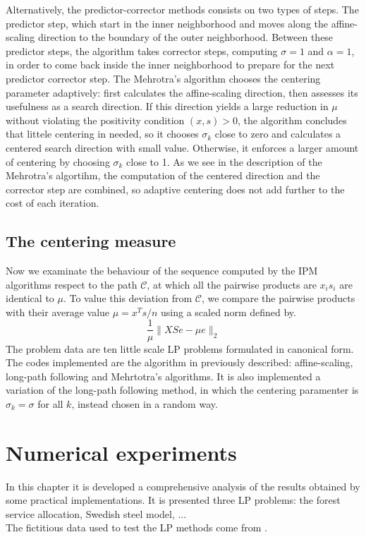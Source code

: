 \documentclass[a4paper,10 pt,titlepage,twoside]{book}
\theoremstyle{plain}
\theoremstyle{definition}
\theoremstyle{remark}
\begin{document}
Alternatively, the predictor-corrector methods consists on two types of steps. The predictor step, which start in the inner neighborhood and moves along the affine-scaling direction to the boundary of the outer neighborhood. Between these predictor steps, the algorithm takes corrector steps, computing $\sigma = 1$ and $\alpha= 1$, in order to come back inside the inner neighborhood to prepare for the next predictor corrector step. The Mehrotra's algorithm chooses the centering parameter adaptively: first calculates the affine-scaling direction, then assesses its usefulness as a search direction. If this direction yields a large reduction in $\mu$ without violating the positivity condition $(x, s)> 0$, the algorithm concludes that littele centering in needed, so it chooses $\sigma_{k}$ close to zero and calculates a centered search direction with small value. Otherwise, it enforces a larger amount of centering by choosing $\sigma_{k}$ close to 1. As we see in the description of the Mehrotra's algortihm, the computation of the centered direction and the corrector step are combined, so adaptive centering does not add further to the cost of each iteration. 

\section*{The centering measure}
Now we examinate the behaviour of the sequence computed by the IPM algorithms respect to the path $\mathcal{C}$, at which all the pairwise products are $x_{i}s_{i}$ are identical to $\mu$. To value this deviation from $\mathcal{C}$, we compare the pairwise products with their average value $\mu = x^{T}s/n$ using a scaled norm defined by. 
\begin{equation}
\frac{1}{\mu}\lVert XSe - \mu e \rVert_{2}
\end{equation}
The problem data are ten little scale LP problems formulated in canonical form. The codes implemented are the algorithm in previously described: affine-scaling, long-path following and Mehrtotra's algorithms. It is also implemented a variation of the long-path following method, in which the centering paramenter is $\sigma_{k}=\sigma$ for all $k$, instead chosen in a random way.



\chapter{Numerical experiments}
In this chapter it is developed a comprehensive analysis of the results obtained by some practical implementations. It is presented three LP problems: the forest service allocation, Swedish steel model, ...\\
The fictitious data used to test the LP methods come from \cite{RR}.
\end{document}
